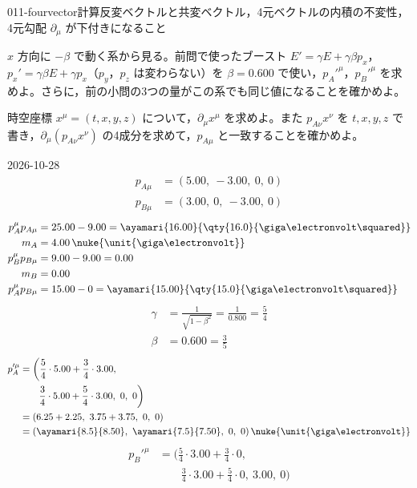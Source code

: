 \documentclass[uplatex,dvipdfmx,a4paper,11pt]{jsarticle}
\begin{document}
\begin{mondai}{011-fourvector}{計算}{反変ベクトルと共変ベクトル，4元ベクトルの内積の不変性，4元勾配 $\partial_\mu$ が下付きになること}
\begin{shoumon}
    \item $x$ 方向に $-\beta$ で動く系から見る。前問で使ったブースト $E'=\gamma E+\gamma\beta p_x$，$p_x'=\gamma\beta E+\gamma p_x$（$p_y$，$p_z$ は変わらない）を $\beta=0.600$ で使い，$p_A'^\mu$，$p_B'^\mu$ を求めよ。さらに，前の小問の3つの量がこの系でも同じ値になることを確かめよ。
    \item 時空座標 $x^\mu=(t,x,y,z)$ について，$\partial_\mu x^\mu$ を求めよ。また $p_{A\nu}x^\nu$ を $t,x,y,z$ で書き，$\partial_\mu(p_{A\nu}x^\nu)$ の4成分を求めて，$p_{A\mu}$ と一致することを確かめよ。
  \end{shoumon}
\begin{kotaeutsushi}{2026-10-28}
\begin{align*}
  p_{A\mu}&=(5.00,\ -3.00,\ 0,\ 0)\\
  p_{B\mu}&=(3.00,\ 0,\ -3.00,\ 0)
\end{align*}
\begin{align*}
  p_{A}^{\mu}p_{A\mu}&=25.00-9.00=\ayamari{16.00}{\qty{16.0}{\giga\electronvolt\squared}}\\
  m_{A}&=4.00\,\nuke{\unit{\giga\electronvolt}}\\
  p_{B}^{\mu}p_{B\mu}&=9.00-9.00=0.00\\
  m_{B}&=0.00\\
  p_{A}^{\mu}p_{B\mu}&=15.00-0=\ayamari{15.00}{\qty{15.0}{\giga\electronvolt\squared}}
\end{align*}
\begin{align*}
  \gamma&=\frac{1}{\sqrt{1-\beta^{2}}}=\frac{1}{0.800}=\frac{5}{4}\\
  \beta&=0.600=\frac{3}{5}
\end{align*}
\begin{align*}
  p_{A}'^{\mu}&=\biggl(\frac{5}{4}\cdot5.00+\frac{3}{4}\cdot3.00,\\
  &\qquad\frac{3}{4}\cdot5.00+\frac{5}{4}\cdot3.00,\ 0,\ 0\biggr)\\
  &=(6.25+2.25,\ 3.75+3.75,\ 0,\ 0)\\
  &=(\ayamari{8.5}{8.50},\ \ayamari{7.5}{7.50},\ 0,\ 0)\,\nuke{\unit{\giga\electronvolt}}
\end{align*}
\begin{align*}
  p_{B}'^{\mu}&=\biggl(\frac{5}{4}\cdot3.00+\frac{3}{4}\cdot0,\\
  &\qquad\frac{3}{4}\cdot3.00+\frac{5}{4}\cdot0,\ 3.00,\ 0\biggr)\\

\end{align*}
\end{kotaeutsushi}
\end{mondai}
\end{document}
